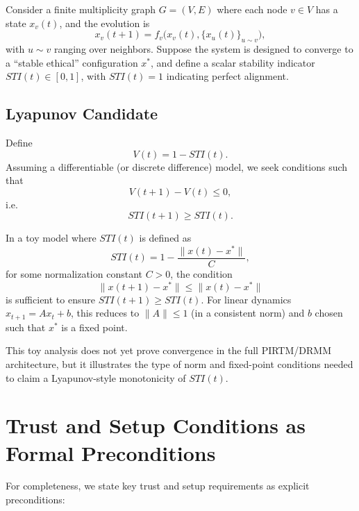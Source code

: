 \documentclass[11pt]{article}
\begin{document}
Consider a finite multiplicity graph $G = (V,E)$ where each node $v \in V$ has a state $x_v(t)$, and the evolution is
\[
  x_v(t+1)
  = f_v\bigl( x_v(t), \{x_u(t)\}_{u \sim v} \bigr),
\]
with $u \sim v$ ranging over neighbors.
Suppose the system is designed to converge to a ``stable ethical'' configuration $x^*$, and define a scalar stability indicator $STI(t) \in [0,1]$, with $STI(t) = 1$ indicating perfect alignment.

\subsection{Lyapunov Candidate}

Define
\[
  V(t) = 1 - STI(t).
\]
Assuming a differentiable (or discrete difference) model, we seek conditions such that
\[
  V(t+1) - V(t) \le 0,
\]
i.e.
\[
  STI(t+1) \ge STI(t).
\]

In a toy model where $STI(t)$ is defined as
\[
  STI(t) = 1 - \frac{\lVert x(t) - x^* \rVert}{C},
\]
for some normalization constant $C > 0$, the condition
\[
  \lVert x(t+1) - x^* \rVert \le \lVert x(t) - x^* \rVert
\]
is sufficient to ensure $STI(t+1) \ge STI(t)$.
For linear dynamics $x_{t+1} = A x_t + b$, this reduces to $\lVert A \rVert \le 1$ (in a consistent norm) and $b$ chosen such that $x^*$ is a fixed point.

This toy analysis does not yet prove convergence in the full PIRTM/DRMM architecture, but it illustrates the type of norm and fixed-point conditions needed to claim a Lyapunov-style monotonicity of $STI(t)$.

\section{Trust and Setup Conditions as Formal Preconditions}

For completeness, we state key trust and setup requirements as explicit preconditions:
\end{document}
